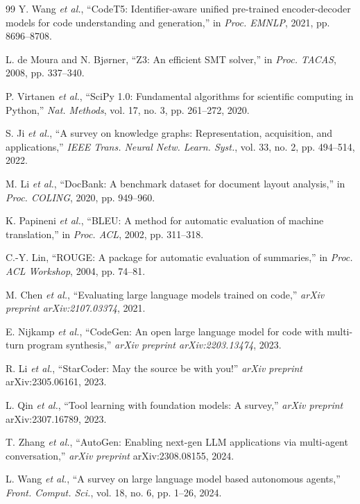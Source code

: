\documentclass{ieeeaccess}
\begin{document}
\begin{thebibliography}{99}
Y. Wang \emph{et al.}, ``CodeT5: Identifier-aware unified pre-trained encoder-decoder models for code understanding and generation,'' in \emph{Proc. EMNLP}, 2021, pp. 8696--8708.

L. de Moura and N. Bj{\o}rner, ``Z3: An efficient SMT solver,'' in \emph{Proc. TACAS}, 2008, pp. 337--340.

P. Virtanen \emph{et al.}, ``SciPy 1.0: Fundamental algorithms for scientific computing in Python,'' \emph{Nat. Methods}, vol. 17, no. 3, pp. 261--272, 2020.

S. Ji \emph{et al.}, ``A survey on knowledge graphs: Representation, acquisition, and applications,'' \emph{IEEE Trans. Neural Netw. Learn. Syst.}, vol. 33, no. 2, pp. 494--514, 2022.

M. Li \emph{et al.}, ``DocBank: A benchmark dataset for document layout analysis,'' in \emph{Proc. COLING}, 2020, pp. 949--960.

K. Papineni \emph{et al.}, ``BLEU: A method for automatic evaluation of machine translation,'' in \emph{Proc. ACL}, 2002, pp. 311--318.

C.-Y. Lin, ``ROUGE: A package for automatic evaluation of summaries,'' in \emph{Proc. ACL Workshop}, 2004, pp. 74--81.

M. Chen \emph{et al.}, ``Evaluating large language models trained on code,'' \emph{arXiv preprint arXiv:2107.03374}, 2021.

E. Nijkamp \emph{et al.}, ``CodeGen: An open large language model for code with multi-turn program synthesis,'' \emph{arXiv preprint arXiv:2203.13474}, 2023.

R. Li \emph{et al.}, ``StarCoder: May the source be with you!'' \emph{arXiv preprint} arXiv:2305.06161, 2023.

L. Qin \emph{et al.}, ``Tool learning with foundation models: A survey,'' \emph{arXiv preprint} arXiv:2307.16789, 2023.

T. Zhang \emph{et al.}, ``AutoGen: Enabling next-gen LLM applications via multi-agent conversation,'' \emph{arXiv preprint} arXiv:2308.08155, 2024.

L. Wang \emph{et al.}, ``A survey on large language model based autonomous agents,'' \emph{Front. Comput. Sci.}, vol. 18, no. 6, pp. 1--26, 2024.

\end{thebibliography}

\EOD
\end{document}
